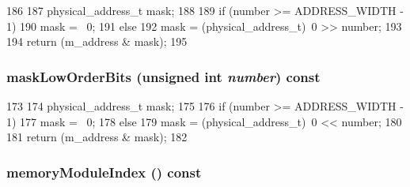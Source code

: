 \begin{DoxyCode}
186 {
187     physical_address_t mask;
188 
189     if (number >= ADDRESS_WIDTH - 1) {
190         mask = ~0;
191     } else {
192         mask = (physical_address_t)~0 >> number;
193     }
194     return (m_address & mask);
195 }
\end{DoxyCode}
\hypertarget{classAddress_a9f50b73bd84b2fa8566f66416a04a1df}{
\subsubsection[{maskLowOrderBits}]{ maskLowOrderBits (unsigned int {\em number}) const}}
\label{classAddress_a9f50b73bd84b2fa8566f66416a04a1df}



\begin{DoxyCode}
173 {
174   physical_address_t mask;
175 
176   if (number >= ADDRESS_WIDTH - 1) {
177       mask = ~0;
178   } else {
179       mask = (physical_address_t)~0 << number;
180   }
181   return (m_address & mask);
182 }
\end{DoxyCode}
\hypertarget{classAddress_a90f2c61fd9821553b17cdf29d5a3c662}{
\subsubsection[{memoryModuleIndex}]{ memoryModuleIndex () const}}
\label{classAddress_a90f2c61fd9821553b17cdf29d5a3c662}



